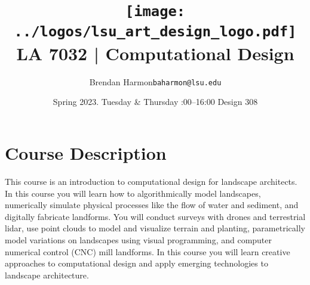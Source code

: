 \documentclass[11pt,article,oneside]{memoir}
\makeatletter
\def\myauthor{Author}
\def\mytitle{Title}
\def\myemail{baharmon@lsu.edu}
\def\myauthor{Brendan Harmon}
\def\mytitle{ \texttt{[image: ../logos/lsu\_art\_design\_logo.pdf]} \\[0.1cm] {\normalfont \normalsize LA 7032 |} \Large Computational Design}
\newcommand{\globalcolor}[1]{%
  \color{#1}\global\let\default@color\current@color
}
\makeatother
\begin{document}
\setlength\bibitemsep{0.5em}

\setmainfont{IBM Plex Sans}
\setmonofont[Scale=0.8]{IBM Plex Mono}

\def\ind{\hangindent=1 true cm\hangafter=1 \noindent}
\def\labelitemi{$\cdot$}

\title{\LARGE \mytitle}
\author{\Large\myauthor \newline \footnotesize\texttt{\noindent\myemail}}
\date{Spring 2023. \newline Tuesday \& Thursday :00--16:00 \newline Design 308}
\published{\,}


\globalcolor{black}
\vspace*{-10em}
\maketitle
{}
\clearpage



\globalcolor{black}

\vspace*{-10em}
\maketitle

\section{Course Description}

This course is an introduction to 
computational design for landscape architects.
In this course you will learn how to 
algorithmically model landscapes,
numerically simulate physical processes 
like the flow of water and sediment,
and digitally fabricate landforms.  
You will conduct surveys with drones and terrestrial lidar,
use point clouds to model and visualize terrain and planting,
parametrically model variations on landscapes
using visual programming, 
and computer numerical control (CNC) mill landforms. 
In this course you will 
learn creative approaches to computational design 
and apply emerging technologies to landscape architecture.
\\
\end{document}
